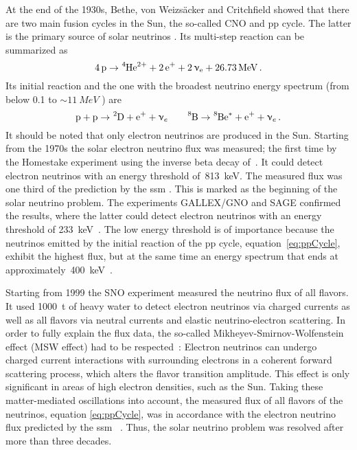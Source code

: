 At the end of the 1930s, Bethe, von Weizsäcker and Critchfield showed that there are two main fusion cycles in the Sun, the so-called CNO and pp cycle. The latter is the primary source of solar neutrinos \cite{Weiz1938, Bethe38, Bethe39}. Its multi-step reaction can be summarized as~\cite{zuber2011neutrino}
\begin{equation}
	\ce{4p} 
	\rightarrow 
	\ce{^4He^{2+}} +
	\ce{2e^+} +
	\ce{2\eneutrino} +
	\SI{26.73}{MeV}
	\fullstop
\end{equation}
Its initial reaction and the one with the broadest neutrino energy spectrum (from below 0.1 to $\sim\SI{11}{MeV}$ \cite{ReviewOfParticlePhysics}) are
\begin{equation}
\ce{p} + \ce{p} \rightarrow \ce{^2D} + \ce{e^+} + \upnu_e
\qquad
\ce{^8B} \rightarrow \ce{^8Be^*} + \ce{e^+} + \upnu_e \fullstop
\label{eq:ppCycle}
\end{equation}
It should be noted that only electron neutrinos are produced in the Sun. Starting from the 1970s the solar electron neutrino flux was measured; the first time by the Homestake experiment using the inverse beta decay of~. It could detect electron neutrinos with an energy threshold of~\SI{813}{keV}. The measured flux was one third of the prediction by the \gls{ssm} \cite{Cleveland1998, Bahcall2001}. This is marked as the beginning of the solar neutrino problem. The experiments GALLEX/GNO and SAGE confirmed the results, where the latter could detect electron neutrinos with an energy threshold of \SI{233}{keV}~\cite{Kirsten1998, Altmann2005, Abdurashitov2009}. The low energy threshold is of importance because the neutrinos emitted by the initial reaction of the pp cycle, equation~\eqref{eq:ppCycle}, exhibit the highest flux, but at the same time an energy spectrum that ends at approximately~\SI{400}{keV}~\cite{Bahcall1996}. 

Starting from 1999 the SNO experiment measured the neutrino flux of all flavors. It used \SI{1000}{t} of heavy water  to detect electron neutrinos via charged currents as well as all flavors via neutral currents and elastic neutrino-electron scattering. In order to fully explain the flux data, the so-called Mikheyev-Smirnov-Wolfenstein effect (MSW effect) had to be respected~\cite{Wolfenstein1977, Mikheev1986}: Electron neutrinos can undergo charged current interactions with surrounding electrons in a coherent forward scattering process, which alters the flavor transition amplitude. This effect is only significant in areas of high electron densities, such as the Sun. Taking these matter-mediated oscillations into account, the measured flux of all flavors of the  neutrinos, equation \eqref{eq:ppCycle}, was in accordance with the electron neutrino flux predicted by the \gls{ssm}~ \cite{Aharmim2013}. Thus, the solar neutrino problem was resolved after more than three decades.

